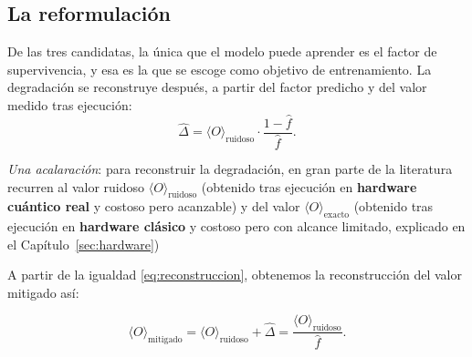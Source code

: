 \subsection{La reformulación}
\label{sec:reformulacion}

De las tres candidatas, la única que el modelo puede aprender es el factor de supervivencia, y
esa es la que se escoge como objetivo de entrenamiento. La degradación se
reconstruye después, a partir del factor predicho y del valor medido tras ejecución:
\begin{equation}
\label{eq:reconstruccion}
\hat\Delta = \langle O \rangle_{\text{ruidoso}}\cdot\frac{1 - \hat f}{\hat f} .
\end{equation}


\textit{Una acalaración}: para reconstruir la degradación, en gran parte de la literatura  recurren al valor ruidoso $\langle O \rangle_{\text{ruidoso}}$ (obtenido tras ejecución en \textbf{hardware cuántico real} y costoso pero acanzable) y del valor $\langle O \rangle_{\text{exacto}}$ (obtenido tras ejecución en \textbf{hardware clásico} y costoso pero con alcance limitado, explicado en el Capítulo~\ref{sec:hardware})



\begin{center} 
\end{center}


A partir de la igualdad \ref{eq:reconstruccion}, obtenemos la reconstrucción del valor mitigado así:

\begin{equation}
\label{eq:mitigado}
\langle O \rangle_{\text{mitigado}}
  = \langle O \rangle_{\text{ruidoso}} + \hat\Delta
  = \frac{\langle O \rangle_{\text{ruidoso}}}{\hat f} .
\end{equation}

